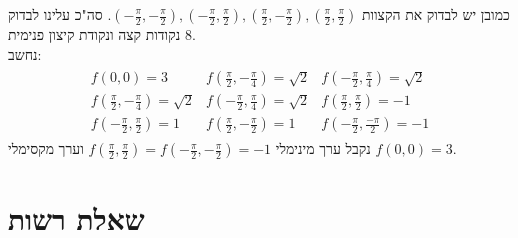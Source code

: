 \documentclass{article}
\begin{document}
כמובן יש לבדוק את הקצוות $(-\frac{\pi}{2}, -\frac{\pi}{2}), (-\frac{\pi}{2}, \frac{\pi}{2}), (\frac{\pi}{2}, -\frac{\pi}{2}), (\frac{\pi}{2}, \frac{\pi}{2})$. סה"כ עלינו לבדוק 8 נקודות קצה ונקודת קיצון פנימית.\\
נחשב:
\begin{align*}
    \begin{matrix}
        f(0,0)=3                                 & f(\frac{\pi}{2}, -\frac{\pi}{4})=\sqrt{2} & f(-\frac{\pi}{2}, \frac{\pi}{4})=\sqrt{2} \\
        f(\frac{\pi}{2},-\frac{\pi}{4})=\sqrt{2} & f(-\frac{\pi}{2},\frac{\pi}{4})=\sqrt{2}  & f(\frac{\pi}{2}, \frac{\pi}{2})=-1        \\
        f(-\frac{\pi}{2}, \frac{\pi}{2})=1       & f(\frac{\pi}{2}, -\frac{\pi}{2})=1        & f(-\frac{\pi}{2}, \frac{-\pi}{2})=-1
    \end{matrix}
\end{align*}
נקבל ערך מינימלי $f(\frac{\pi}{2}, \frac{\pi}{2})=f(-\frac{\pi}{2}, -\frac{\pi}{2})=-1$
וערך מקסימלי $f(0,0)=3$.

\pagebreak

\section*{שאלת רשות}
\end{document}

